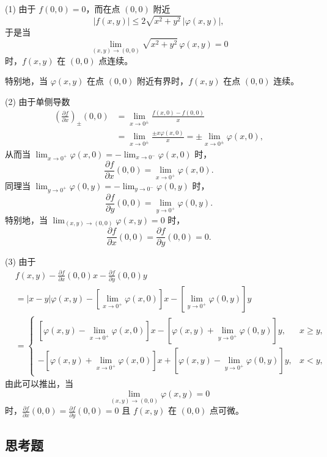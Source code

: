 \begin{xsolution}
(1) 由于 $f(0,0)=0$，而在点 $(0,0)$ 附近
\[
  |f(x,y)|\le2\sqrt{x^2+y^2}\,|\varphi(x,y)|,
\]
于是当
\[
  \lim_{(x,y)\to(0,0)}\sqrt{x^2+y^2}\,\varphi(x,y)=0
\]
时，$f(x,y)$ 在 $(0,0)$ 点连续。

特别地，当 $\varphi(x,y)$ 在点 $(0,0)$ 附近有界时，$f(x,y)$ 在点 $(0,0)$ 连续。

(2) 由于单侧导数
\begin{align*}
  \left(\frac{\partial f}{\partial x}\right)_{\pm}(0,0)
  &=\lim_{x\to0^{\pm}}\frac{f(x,0)-f(0,0)}{x}\\
  &=\lim_{x\to0^{\pm}}\frac{\pm x\varphi(x,0)}{x}
  =\pm\lim_{x\to0^{\pm}}\varphi(x,0),
\end{align*}
从而当 $\lim_{x\to0^+}\varphi(x,0)=-\lim_{x\to0^-}\varphi(x,0)$ 时，
\[
  \frac{\partial f}{\partial x}(0,0)=\lim_{x\to0^+}\varphi(x,0).
\]
同理当 $\lim_{y\to0^+}\varphi(0,y)=-\lim_{y\to0^-}\varphi(0,y)$ 时，
\[
  \frac{\partial f}{\partial y}(0,0)=\lim_{y\to0^+}\varphi(0,y).
\]
特别地，当 $\lim_{(x,y)\to(0,0)}\varphi(x,y)=0$ 时，
\[
  \frac{\partial f}{\partial x}(0,0)=\frac{\partial f}{\partial y}(0,0)=0.
\]

(3) 由于
\begin{align*}
  &f(x,y)-\frac{\partial f}{\partial x}(0,0)x-\frac{\partial f}{\partial y}(0,0)y\\
  &=|x-y|\varphi(x,y)-\left[\lim_{x\to0^+}\varphi(x,0)\right]x
    -\left[\lim_{y\to0^+}\varphi(0,y)\right]y\\
  &=\begin{cases}
    \left[\varphi(x,y)-\lim_{x\to0^+}\varphi(x,0)\right]x
    -\left[\varphi(x,y)+\lim_{y\to0^+}\varphi(0,y)\right]y, & x\ge y,\\
    -\left[\varphi(x,y)+\lim_{x\to0^+}\varphi(x,0)\right]x
    +\left[\varphi(x,y)-\lim_{y\to0^+}\varphi(0,y)\right]y, & x<y,
  \end{cases}
\end{align*}
由此可以推出，当
\[
  \lim_{(x,y)\to(0,0)}\varphi(x,y)=0
\]
时，$\frac{\partial f}{\partial x}(0,0)=\frac{\partial f}{\partial y}(0,0)=0$ 且 $f(x,y)$ 在 $(0,0)$ 点可微。
\end{xsolution}

\subsection{思考题}

